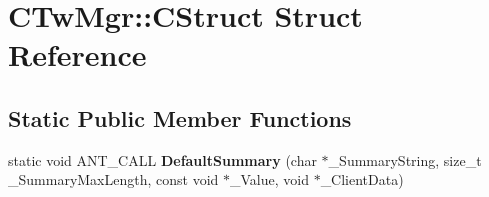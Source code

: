 \hypertarget{struct_c_tw_mgr_1_1_c_struct}{\section{C\+Tw\+Mgr\+:\+:C\+Struct Struct Reference}
\label{struct_c_tw_mgr_1_1_c_struct}
}
\subsection*{Static Public Member Functions}
\begin{DoxyCompactItemize}
\item 
\hypertarget{struct_c_tw_mgr_1_1_c_struct_ac63bf6e5f9a793f572a4642a0bc3ad40}{static void A\+N\+T\+\_\+\+C\+A\+L\+L {\bfseries Default\+Summary} (char $\ast$\+\_\+\+Summary\+String, size\+\_\+t \+\_\+\+Summary\+Max\+Length, const void $\ast$\+\_\+\+Value, void $\ast$\+\_\+\+Client\+Data)}\label{struct_c_tw_mgr_1_1_c_struct_ac63bf6e5f9a793f572a4642a0bc3ad40}

\end{DoxyCompactItemize}
